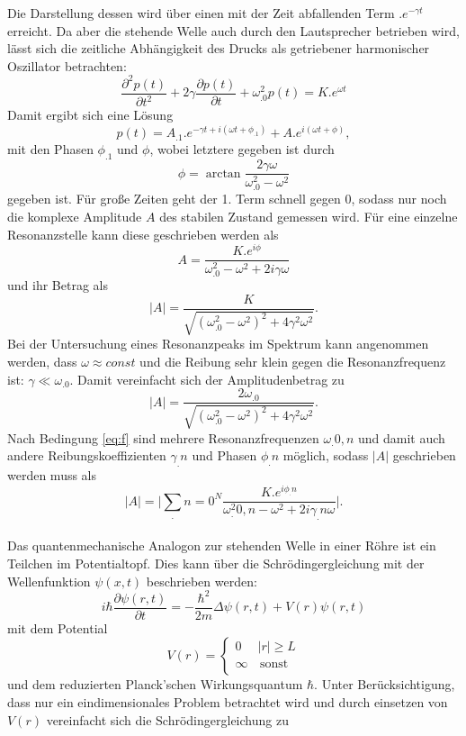 Die Darstellung dessen wird über einen mit der Zeit abfallenden Term $.e^{-\gamma t}$ erreicht.
Da aber die stehende Welle auch durch den Lautsprecher betrieben wird, lässt sich die zeitliche Abhängigkeit des Drucks als getriebener harmonischer Oszillator betrachten:
\[
\frac{\partial^2p(t)}{\partial t^2}+2\gamma\frac{\partial p(t)}{\partial t}+\omega_.0^2p(t)=K .e^{\omega t}
\]
Damit ergibt sich eine Lösung 
\[
p(t)=A_.1 .e^{-\gamma t+i(\omega t+\phi_.1)}+A .e^{i(\omega t + \phi)},
\]
mit den Phasen $\phi_.1$ und $\phi$, wobei letztere gegeben ist durch 
\[
\phi=\arctan{\frac{2\gamma\omega}{\omega^2_.0-\omega^2}}
\]
gegeben ist.
Für große Zeiten geht der 1. Term schnell gegen $0$, sodass nur noch die komplexe Amplitude $A$ des stabilen Zustand gemessen wird.
Für eine einzelne Resonanzstelle kann diese geschrieben werden als
\[
A=\frac{K .e^{i\phi}}{\omega^2_.0-\omega^2+2i\gamma\omega}
\]
und ihr Betrag als
\[
|A|=\frac{K}{\sqrt{\left(\omega^2_.0-\omega^2\right)^2+4\gamma^2\omega^2}}\text{.}
\]
Bei der Untersuchung eines Resonanzpeaks im Spektrum kann angenommen werden, dass $\omega\approx const$ und die Reibung sehr klein gegen die Resonanzfrequenz ist: $\gamma\ll\omega_.0$. Damit vereinfacht sich der Amplitudenbetrag zu
\[
|A|=\frac{2\omega_.0}{\sqrt{\left(\omega^2_.0-\omega^2\right)^2+4\gamma^2\omega^2}}\text{.}
\]
Nach Bedingung \eqref{eq:f} sind mehrere Resonanzfrequenzen $\omega_.{0,n}$ und damit auch andere Reibungskoeffizienten $\gamma_.n$ und Phasen $\phi_.n$ möglich, sodass $|A|$ geschrieben werden muss als
\begin{equation}
|A|=\biggl|\sum_.{n=0}^N\frac{K .e^{i\phi_.n}}{\omega^2_.{0,n}-\omega^2+2 i\gamma_.n\omega}\biggl|\text{.}\label{eq:absA}
\end{equation}
\\
\newline
Das quantenmechanische Analogon zur stehenden Welle in einer Röhre ist ein Teilchen im Potentialtopf.
Dies kann über die Schrödingergleichung mit der Wellenfunktion $\psi(x,t)$ beschrieben werden:
\[
i\hbar\frac{\partial\psi(r,t)}{\partial t}=-\frac{\hbar^2}{2m}\Delta\psi(r,t) + V(r)\psi(r,t)
\]
mit dem Potential 
\[V(r) = \left\{
\begin{array}{ll}
0 & |r| \geq L \\
\infty & \, \textrm{sonst} \\
\end{array}
\right.
\]
und dem reduzierten Planck'schen Wirkungsquantum $\hbar$.
Unter Berücksichtigung, dass nur ein eindimensionales Problem betrachtet wird und durch einsetzen von $V(r)$ vereinfacht sich die Schrödingergleichung zu
